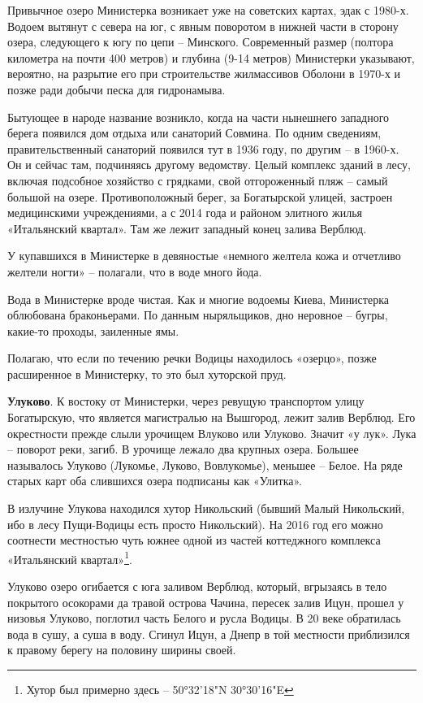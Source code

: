 
Привычное озеро Министерка возникает уже на советских картах, эдак с 1980-х. Водоем вытянут с севера на юг, с явным поворотом в нижней части в сторону озера, следующего к югу по цепи – Минского. Современный размер (полтора километра на почти 400 метров) и глубина (9-14 метров) Министерки указывают, вероятно, на разрытие его при строительстве жилмассивов Оболони в 1970-х и позже ради добычи песка для гидронамыва.

Бытующее в народе название возникло, когда на части нынешнего западного берега появился дом отдыха или санаторий Совмина. По одним сведениям, правительственный санаторий появился тут в 1936 году, по другим – в 1960-х. Он и сейчас там, подчиняясь другому ведомству. Целый комплекс зданий в лесу, включая подсобное хозяйство с грядками, свой отгороженный пляж – самый большой на озере. Противоположный берег, за Богатырской улицей, застроен медицинскими учреждениями, а с 2014 года и районом элитного жилья «Итальянский квартал». Там же лежит западный конец залива Верблюд.

У купавшихся в Министерке в девяностые «немного желтела кожа и отчетливо желтели ногти» – полагали, что в воде много йода.

Вода в Министерке вроде чистая. Как и многие водоемы Киева, Министерка облюбована браконьерами. По данным ныряльщиков, дно неровное – бугры, какие-то проходы, заиленные ямы.

Полагаю, что если по течению речки Водицы находилось «озерцо», позже расширенное в Министерку, то это был хуторской пруд.

\textbf{Улуково}. К востоку от Министерки, через ревущую транспортом улицу Богатырскую, что является магистралью на Вышгород, лежит залив Верблюд. Его окрестности прежде слыли урочищем Влуково или Улуково. Значит «у лук». Лука – поворот реки, загиб. В урочище лежало два крупных озера. Большее называлось Улуково (Лукомье, Луково, Вовлукомье), меньшее – Белое. На ряде старых карт оба слившихся озера подписаны как «Улитка».

В излучине Улукова находился хутор Никольский (бывший Малый Никольский, ибо в лесу Пущи-Водицы есть просто Никольский). На 2016 год его можно соотнести местностью чуть южнее одной из частей коттеджного комплекса «Итальянский квартал»\footnote{Хутор был примерно здесь – 50°32'18"N 30°30'16"E}.

Улуково озеро огибается с юга заливом Верблюд, который, вгрызаясь в тело покрытого осокорами да травой острова Чачина, пересек залив Ицун, прошел у низовья Улуково, поглотил часть Белого и русла Водицы. В 20 веке обратилась вода в сушу, а суша в воду. Сгинул Ицун, а Днепр в той местности приблизился к правому берегу на половину ширины своей.

